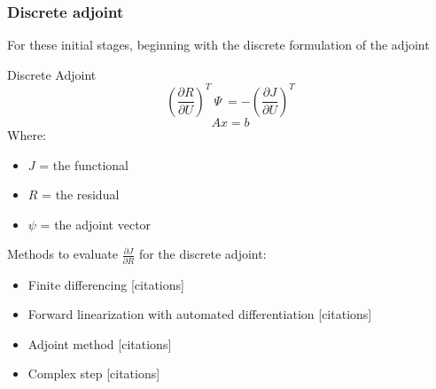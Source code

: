 \documentclass{beamer}
\begin{document}
\begin{frame}
\frametitle{Discrete adjoint}
\scriptsize
For these initial stages, beginning with the discrete formulation of the adjoint
\begin{minipage}[t][0.6\textheight]{0.75\textwidth}
\scriptsize
\vspace{-10pt}
\begin{exampleblock}{Discrete Adjoint}
\[
\left( \frac{\partial{R}}{\partial{U}} \right)^T ~\Psi~ = -\left( \frac{\partial{J}}{\partial{U}} \right)^T
\]
\[
Ax = b
\]
\tiny
Where:
\begin{itemize}
\item \textbf{$J$} = the functional
\item \textbf{$R$} =  the residual
\item \textbf{$\psi$} = the adjoint vector
\end{itemize}
\end{exampleblock}
\end{minipage}

Methods to evaluate $\frac{\partial{J}}{\partial{R}} $  for the discrete adjoint:
\begin{itemize}
\scriptsize
\item Finite differencing {\color{red}[citations]}
\item Forward linearization with automated differentiation {\color{red}[citations]}
\item Adjoint method {\color{red}[citations]}
\item Complex step {\color{red}[citations]}
\end{itemize}


\end{frame}


\end{document}
